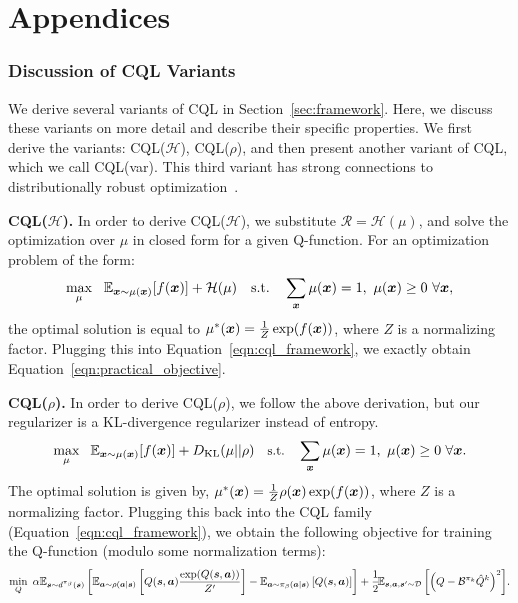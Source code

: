 \part*{Appendices}


\section{Discussion of CQL Variants}
\label{app:cql_variants}
We derive several variants of CQL in Section~\ref{sec:framework}. Here, we discuss these variants on more detail and describe their specific properties. We first derive the variants: CQL($\mathcal{H}$), CQL($\rho$), and then present another variant of CQL, which we call CQL(var). This third variant has strong connections to distributionally robust optimization~\citep{namkoong2017variance}.

\textbf{CQL($\mathcal{H}$).} In order to derive CQL($\mathcal{H}$), we substitute $\mathcal{R} = \mathcal{H}(\mu)$, and solve the optimization over $\mu$ in closed form for a given Q-function. For an optimization problem of the form:
\begin{equation*}
    \max_{\mu}~~ \mathbb{E}_{\boldsymbol{x} \sim \mu(\boldsymbol{x})}[f(\boldsymbol{x})] + \mathcal{H}(\mu)~~~ \text{s.t.}~~~ \sum_{\boldsymbol{x}} \mu(\boldsymbol{x}) = 1,~ \mu({\boldsymbol{x}}) \geq 0~ \forall \boldsymbol{x},
\end{equation*}
the optimal solution is equal to $\mu^*(\boldsymbol{x}) = \frac{1}{Z} \exp(f(\boldsymbol{x}))$, where $Z$ is a normalizing factor. Plugging this into Equation~\ref{eqn:cql_framework}, we exactly obtain Equation~\ref{eqn:practical_objective}.

\textbf{CQL($\rho$).} In order to derive CQL($\rho$), we follow the above derivation, but our regularizer is a KL-divergence regularizer instead of entropy.
\begin{equation*}
    \small{\max_{\mu}~~ \mathbb{E}_{\boldsymbol{x}\sim \mu(\boldsymbol{x})}[f(\boldsymbol{x})] + D_{\mathrm{KL}}(\mu || \rho)~~~ \text{s.t.}~~~ \sum_{\boldsymbol{x}} \mu(\boldsymbol{x}) = 1,~ \mu({\boldsymbol{x}}) \geq 0~ \forall \boldsymbol{x}}.
\end{equation*}
The optimal solution is given by, $\mu^*(\boldsymbol{x}) = \frac{1}{Z} \rho(\boldsymbol{x}) \exp(f(\boldsymbol{x}))$, where $Z$ is a normalizing factor. Plugging this back into the CQL family (Equation~\ref{eqn:cql_framework}), we obtain the following objective for training the Q-function (modulo some normalization terms):
\begin{equation}
    \small{\min_{Q}~ \alpha \mathbb{E}_{\boldsymbol{s}\sim d^{\pi_\beta}(\boldsymbol{s})}\left[\mathbb{E}_{\boldsymbol{a}\sim \rho(\boldsymbol{a}|\boldsymbol{s})} \left[Q(\boldsymbol{s}, \boldsymbol{a}) \frac{\exp(Q(\boldsymbol{s}, \boldsymbol{a}))}{Z'}\right] - \mathbb{E}_{\boldsymbol{a}\sim {\pi_\beta}(\boldsymbol{a}|\boldsymbol{s})}\left[Q(\boldsymbol{s}, \boldsymbol{a})\right]\right] + \frac{1}{2}\!\mathbb{E}_{\boldsymbol{s}, \boldsymbol{a}, \boldsymbol{s}' \sim \mathcal{D}}\left[\left(Q - \mathcal{B}^{\pi_k} \hat{Q}^{k} \right)^2 \right]\!.}
    \label{eqn:cql_rho_objective}
\end{equation}

